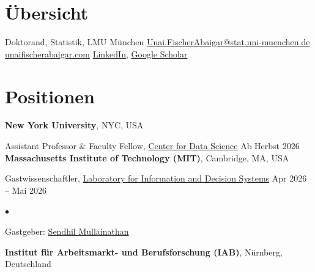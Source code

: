 \documentclass[margin,line, 10pt]{res}
\newenvironment{list2}{
	\begin{list}{$\bullet$}{%
			\setlength{\itemsep}{0in}
			\setlength{\parsep}{0in} \setlength{\parskip}{0in}
			\setlength{\topsep}{0in} \setlength{\partopsep}{0in} 
			\setlength{\leftmargin}{0.2in}}}{\end{list}}
\begin{document}
	
	
	
	\begin{resume}
		\section{\sc \"Ubersicht}
		Doktorand, Statistik, LMU M\"unchen \hfill \href{mailto:Unai.FischerAbaigar@stat.uni-muenchen.de}{Unai.FischerAbaigar@stat.uni-muenchen.de} \\
		\href{https://unaifischerabaigar.com}{unaifischerabaigar.com}  \hfill
		\href{https://www.linkedin.com/in/unai-fa/}{LinkedIn}, \href{https://scholar.google.com/citations?user=m9-CzAMAAAAJ&hl=de&oi=ao}{Google Scholar}
		
		\vspace{-0.3cm}
		
		\section{\sc Positionen}
		
		{\bf New York University}, NYC, USA
		
		\vspace{-0.4cm}
		Assistant Professor \& Faculty Fellow, \href{https://cds.nyu.edu}{Center for Data Science} \hfill {Ab Herbst 2026}\\
		
		\vspace{-0.5cm}
		{\bf Massachusetts Institute of Technology (MIT)}, Cambridge, MA, USA
		
		\vspace{-0.4cm}
		Gastwissenschaftler, \href{https://lids.mit.edu}{Laboratory for Information and Decision Systems} \hfill {Apr 2026 -- Mai 2026}\\
		\begin{list2}
			\vspace*{-0.3cm}
			\item Gastgeber: \href{https://sendhil.org}{Sendhil Mullainathan} 
		\end{list2}
		
		\vspace{-0.2cm}
		{\bf Institut f\"ur Arbeitsmarkt- und Berufsforschung (IAB)}, N\"urnberg, Deutschland
		

\end{resume}
\end{document}

